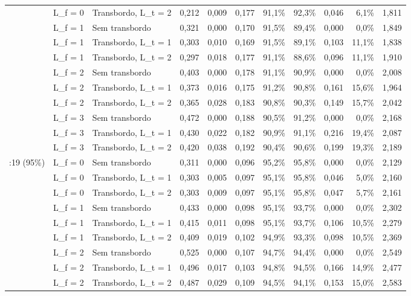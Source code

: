 \begin{table}[htbp]
{\begin{tabular}{lllrrrrrrrr}
 & L\_f = 0 & Transbordo, L\_t = 2 & 0,212 & 0,009 & 0,177 & 91,1\% & 92,3\% & 0,046 & 6,1\% & 1,811 \\
 & L\_f = 1 & Sem transbordo & 0,321 & 0,000 & 0,170 & 91,5\% & 89,4\% & 0,000 & 0,0\% & 1,849 \\
 & L\_f = 1 & Transbordo, L\_t = 1 & 0,303 & 0,010 & 0,169 & 91,5\% & 89,1\% & 0,103 & 11,1\% & 1,838 \\
 & L\_f = 1 & Transbordo, L\_t = 2 & 0,297 & 0,018 & 0,177 & 91,1\% & 88,6\% & 0,096 & 11,1\% & 1,910 \\
 & L\_f = 2 & Sem transbordo & 0,403 & 0,000 & 0,178 & 91,1\% & 90,9\% & 0,000 & 0,0\% & 2,008 \\
 & L\_f = 2 & Transbordo, L\_t = 1 & 0,373 & 0,016 & 0,175 & 91,2\% & 90,8\% & 0,161 & 15,6\% & 1,964 \\
 & L\_f = 2 & Transbordo, L\_t = 2 & 0,365 & 0,028 & 0,183 & 90,8\% & 90,3\% & 0,149 & 15,7\% & 2,042 \\
 & L\_f = 3 & Sem transbordo & 0,472 & 0,000 & 0,188 & 90,5\% & 91,2\% & 0,000 & 0,0\% & 2,168 \\
 & L\_f = 3 & Transbordo, L\_t = 1 & 0,430 & 0,022 & 0,182 & 90,9\% & 91,1\% & 0,216 & 19,4\% & 2,087 \\
 & L\_f = 3 & Transbordo, L\_t = 2 & 0,420 & 0,038 & 0,192 & 90,4\% & 90,6\% & 0,199 & 19,3\% & 2,189 \\
\addlinespace
1:19 (95\%) & L\_f = 0 & Sem transbordo & 0,311 & 0,000 & 0,096 & 95,2\% & 95,8\% & 0,000 & 0,0\% & 2,129 \\
 & L\_f = 0 & Transbordo, L\_t = 1 & 0,303 & 0,005 & 0,097 & 95,1\% & 95,8\% & 0,046 & 5,0\% & 2,160 \\
 & L\_f = 0 & Transbordo, L\_t = 2 & 0,303 & 0,009 & 0,097 & 95,1\% & 95,8\% & 0,047 & 5,7\% & 2,161 \\
 & L\_f = 1 & Sem transbordo & 0,433 & 0,000 & 0,098 & 95,1\% & 93,7\% & 0,000 & 0,0\% & 2,302 \\
 & L\_f = 1 & Transbordo, L\_t = 1 & 0,415 & 0,011 & 0,098 & 95,1\% & 93,7\% & 0,106 & 10,5\% & 2,279 \\
 & L\_f = 1 & Transbordo, L\_t = 2 & 0,409 & 0,019 & 0,102 & 94,9\% & 93,3\% & 0,098 & 10,5\% & 2,369 \\
 & L\_f = 2 & Sem transbordo & 0,525 & 0,000 & 0,107 & 94,7\% & 94,4\% & 0,000 & 0,0\% & 2,549 \\
 & L\_f = 2 & Transbordo, L\_t = 1 & 0,496 & 0,017 & 0,103 & 94,8\% & 94,5\% & 0,166 & 14,9\% & 2,477 \\
 & L\_f = 2 & Transbordo, L\_t = 2 & 0,487 & 0,029 & 0,109 & 94,5\% & 94,1\% & 0,153 & 15,0\% & 2,583 \\

\end{tabular}}
\end{table}
